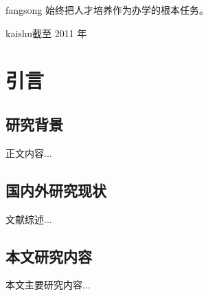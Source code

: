 {\ifcsname fangsong\endcsname\fangsong\else[无 \cs{fangsong} 字体。]\fi 
  始终把人才培养作为办学的根本任务。}

{\ifcsname kaishu\endcsname\kaishu\else[无 \cs{kaishu} 字体。]\fi 截至 2011 年
  }
  

\section{引言}
\subsection{研究背景}
正文内容...

\subsection{国内外研究现状}
文献综述...

\subsection{本文研究内容}
本文主要研究内容...
